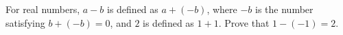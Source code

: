 For real numbers, $a-b$ is defined as $a+(-b)$, where $-b$ is the number satisfying $b+(-b)=0$, and $2$ is defined as $1+1$. Prove that $1-(-1)=2$.
